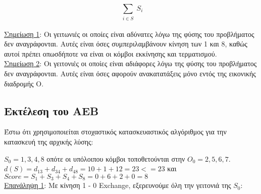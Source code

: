 \documentclass[12pt, a4paper]{article}
\begin{document}
\begin{equation}
 \sum_{\substack{
		 i \in S}}
	S_i
\end{equation}

\underline{Σημείωση 1}: Οι γειτωνιές οι οποίες είναι αδύνατες λόγω της φύσης του προβλήματος δεν αναγράφονται. Αυτές είναι όσες συμπεριλαμβάνουν κίνηση των 1 και 8, καθώς αυτοί πρέπει οπωσδήποτε να είναι οι κόμβοι εκκίνησης και τερματισμού. \\

\underline{Σημείωση 2}: Οι γειτονιές οι οποίες είναι αδιάφορες λόγω της φύσης του προβλήματος δεν αναγράφονται. Αυτές είναι όσες αφορούν ανακατατάξεις μόνο εντός της εικονικής διαδρομής Ο. \\

\subsection{Εκτέλεση του ΑΕΒ}

Έστω ότι χρησιμοποιείται στοχαστικός κατασκευαστικός αλγόριθμος για την κατασκευή της αρχικής λύσης:

\(S_0 = {1,3,4,8}\) οπότε οι υπόλοιπου κόμβοι τοποθετούνται στην \(Ο_0 = {2,5,6,7}\). \\
\(d(S) = d_{13} + d_{34} + d_{48} = 10 + 1 + 12 = 23 <= 23\) και \\
\(Score = S_1 + S_3 + S_4 + S_8 = 0 + 6 + 2 + 0 = 8\) \\


\underline{Επανάληψη 1}: Με κίνηση 1 - 0 Exchange, εξερευνούμε όλη την γειτονιά της \(S_0\):
\end{document}
